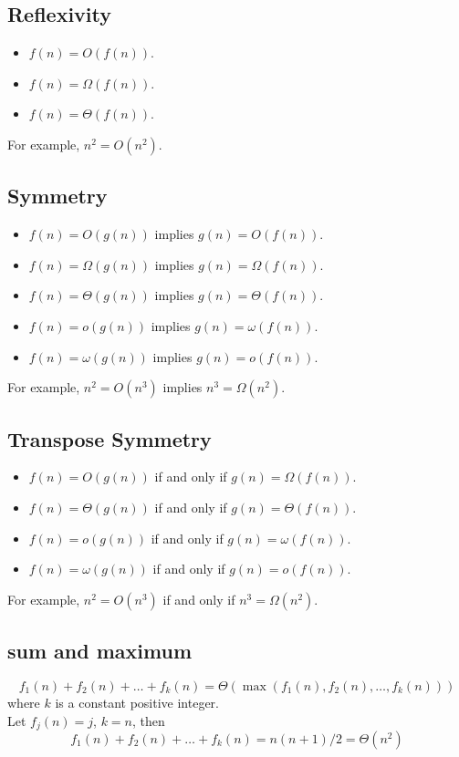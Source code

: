 \documentclass[onecolumn]{report}
\begin{document}
\subsection{Reflexivity}
\begin{itemize}
\item $f(n) = O(f(n))$.
\item $f(n) = \Omega(f(n))$.
\item $f(n) = \Theta(f(n))$.
\end{itemize}
For example, $n^2 = O(n^2)$.

\subsection{Symmetry}
\begin{itemize}
\item $f(n) = O(g(n))$ implies $g(n) = O(f(n))$.
\item $f(n) = \Omega(g(n))$ implies $g(n) = \Omega(f(n))$.
\item $f(n) = \Theta(g(n))$ implies $g(n) = \Theta(f(n))$.
\item $f(n) = o(g(n))$ implies $g(n) = \omega(f(n))$.
\item $f(n) = \omega(g(n))$ implies $g(n) = o(f(n))$.
\end{itemize}
For example, $n^2 = O(n^3)$ implies $n^3 = \Omega(n^2)$.

\subsection{Transpose Symmetry}
\begin{itemize}
\item $f(n) = O(g(n))$ if and only if $g(n) = \Omega(f(n))$.
\item $f(n) = \Theta(g(n))$ if and only if $g(n) = \Theta(f(n))$.
\item $f(n) = o(g(n))$ if and only if $g(n) = \omega(f(n))$.
\item $f(n) = \omega(g(n))$ if and only if $g(n) = o(f(n))$.
\end{itemize}
For example, $n^2 = O(n^3)$ if and only if $n^3 = \Omega(n^2)$.\\

\subsection{sum and maximum}
\begin{equation*}
    f_1(n) + f_2(n)+\dots +f_k(n) = \Theta(\max(f_1(n), f_2(n), \dots, f_k(n)))
\end{equation*}
where $k$ is a constant positive integer.\\
Let $f_j(n) = j$, $k=n$, then
\begin{equation*}
    f_1(n) + f_2(n)+\dots +f_k(n) = n(n+1)/2 = \Theta(n^2)
\end{equation*}
\end{document}
